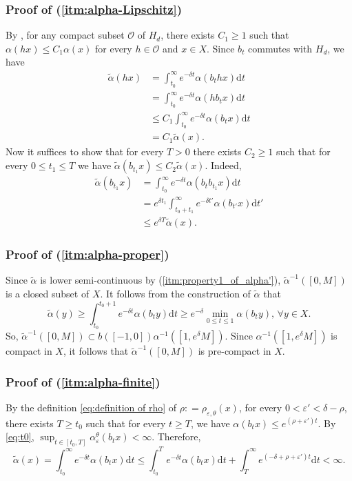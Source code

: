 \documentclass[12pt,reqno]{amsart}
\newcommand{\defeq}{\mathrel{\mathop:}=}
\numberwithin{equation}{section}
\theoremstyle{plain}
\theoremstyle{definition}
\theoremstyle{remark}
\newcommand{\eps}{\varepsilon}
\newcommand{\de}{\mathrm{d}}
\newcommand{\at}{\widetilde{\alpha}}
\begin{document}
		\subsubsection*{Proof of (\ref{itm:alpha-Lipschitz})} By \cite[Lemma 4.1]{Shi20}, for any compact subset $\mathcal{O}$ of $H_d$, there exists $C_1\geq1$ such that $\alpha(hx)\leq C_1\alpha(x)$ for every $h\in\mathcal{O}$ and $x\in X$. Since $b_t$ commutes with $H_d$, we have
			\[
			\begin{split}
			\at(hx) &=\int_{t_0}^{\infty}e^{-\delta t}\alpha(b_{t}hx)\de t\\
			&=\int_{t_0}^{\infty}e^{-\delta t}\alpha(hb_{t}x)\de t\\
			&\leq C_1\int_{t_0}^{\infty}e^{-\delta t}\alpha(b_{t}x)\de t\\
			&=C_1\at(x).
			\end{split}
			\]
			Now it suffices to show that for every $T>0$ there exists $C_2\geq1$ such that for every $0\leq t_1 \leq T$ we have $\at(b_{t_1}x)\leq C_2\at(x)$. Indeed, 
			\[
			\begin{split}
			\at(b_{t_1}x) &=\int_{t_0}^{\infty}e^{-\delta t}\alpha(b_{t}b_{t_1}x)\de t\\
			&=e^{\delta t_1}\int_{t_0+t_1}^\infty e^{-\delta t'}\alpha(b_{t'}x)\de t'\\
			&\leq e^{\delta T}\at(x).
			\end{split}
			\]
			\subsubsection*{Proof of (\ref{itm:alpha-proper})} Since $\at$ is lower semi-continuous by (\ref{itm:property1_of_alpha'}),  $\at^{-1}([0,M])$ is a closed subset of $X$. It follows from the construction of $\at$ that 
            \[
            \at(y)\geq \int_{t_0}^{t_0+1}e^{-\delta t}\alpha(b_ty)\de t \geq e^{-\delta}\min_{0\leq t\leq 1}\alpha(b_ty), \,\forall  y\in X.
            \]
            So, $\at^{-1}([0,M])\subset b([-1,0])\alpha^{-1}([1,e^{\delta}M])$. Since $\alpha^{-1}([1,e^{\delta}M])$ is compact in $X$, it follows that $\at^{-1}([0,M])$ is pre-compact in $X$.
            
            \subsubsection*{Proof of (\ref{itm:alpha-finite})} By the definition \eqref{eq:definition of rho} of $\rho\defeq\rho_{\eps,\theta}(x)$, for every $0<\eps'<\delta-\rho$, there exists $T\geq t_0$ such that for every $t\geq T$, we have $\alpha(b_tx)\leq e^{(\rho+\eps')t}$. By \eqref{eq:t0}, $\sup_{t\in[t_0,T]}\alpha_\eps^\theta(b_tx)<\infty$. Therefore,
            \[
            \at(x) = \int_{t_0}^{\infty}e^{-\delta t}\alpha(b_{t}x)\de t \leq \int_{t_0}^Te^{-\delta t}\alpha(b_tx)\de t+\int_T^\infty e^{(-\delta+\rho+\eps')t}\de t <\infty.
            \]
            
\end{document}

